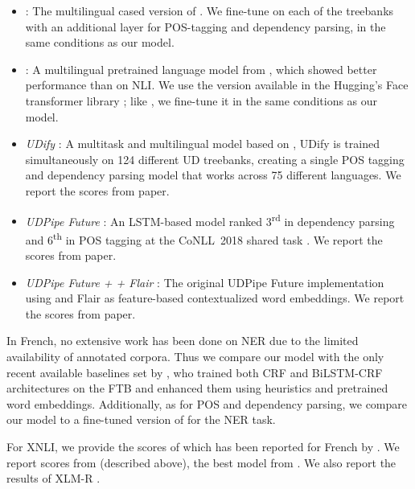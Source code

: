 \begin{itemize}
    \item \emph{\mbert}: The multilingual cased version of \bert. We fine-tune \mbert on each of the treebanks with an additional layer for POS-tagging and dependency parsing, in the same conditions as our \camembert model.
    \item \emph{\xlmmlmtlm}: A multilingual pretrained language model from \citet{conneau-lample-2019-cross}, which showed better performance than \mbert on NLI. We use the version available in the Hugging's Face transformer library \citep{wolf-etal-2019-huggingface}; like \mbert, we fine-tune it in the same conditions as our model.
    \item \emph{UDify} \citep{kondratyuk-straka-2019-75}: A multitask and multilingual model based on \mbert, UDify is trained simultaneously on 124 different UD treebanks, creating a single POS tagging and dependency parsing model that works across 75 different languages. We report the scores from \citet{kondratyuk-straka-2019-75} paper.
    \item \emph{UDPipe Future} \citep{straka-2018-udpipe}: An LSTM-based model ranked 3\textsuperscript{rd} in dependency parsing and 6\textsuperscript{th} in POS tagging at the CoNLL~2018 shared task \citep{seker-etal-2018-universal}. We report the scores from \citet{kondratyuk-straka-2019-75} paper.
    \item \emph{UDPipe Future + \mbert + Flair} \citep{straka-strakova-2019-evaluating}: The original UDPipe Future implementation using \mbert and Flair as feature-based contextualized word embeddings. We report the scores from \citet{straka-strakova-2019-evaluating} paper.
\end{itemize}

In French, no extensive work has been done on NER due to the limited availability of annotated corpora. Thus we compare our model with the only recent available baselines set by \citet{dupont-2017-exploration}, who trained both CRF \citep{lafferty-etal-2001-conditional} and BiLSTM-CRF \citep{lample-etal-2016-neural} architectures on the FTB and enhanced them using heuristics and pretrained word embeddings. Additionally, as for POS and dependency parsing, we compare our model to a fine-tuned version of \mbert for the NER task.

For XNLI, we provide the scores of \mbert which has been reported for French by \citet{wu-dredze-2019-beto}. We report scores from \xlmmlmtlm (described above), the best model from \citet{conneau-lample-2019-cross}. We also report the results of \mbox{XLM-R} \citep{conneau-etal-2020-unsupervised}.

